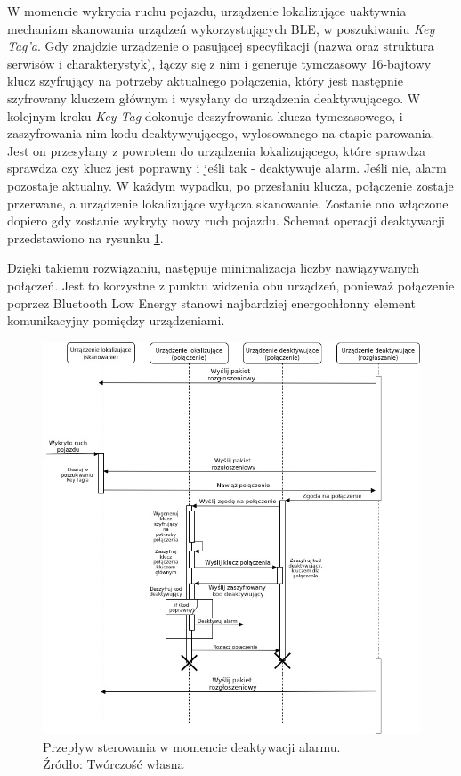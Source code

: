 \pagebreak
W momencie wykrycia ruchu pojazdu, urządzenie lokalizujące uaktywnia mechanizm skanowania urządzeń wykorzystujących BLE, w poszukiwaniu \textit{Key Tag'a}. Gdy znajdzie urządzenie o pasującej specyfikacji (nazwa oraz struktura serwisów i charakterystyk), łączy się z nim i generuje tymczasowy 16-bajtowy klucz szyfrujący na potrzeby aktualnego połączenia, który jest następnie szyfrowany kluczem głównym i wysyłany do urządzenia deaktywującego. W kolejnym kroku \textit{Key Tag} dokonuje deszyfrowania klucza tymczasowego, i zaszyfrowania nim kodu deaktywyującego, wylosowanego na etapie parowania. Jest on przesyłany z powrotem do urządzenia lokalizującego, które sprawdza sprawdza czy klucz jest poprawny i jeśli tak - deaktywuje alarm. Jeśli nie, alarm pozostaje aktualny. W każdym wypadku, po przesłaniu klucza, połączenie zostaje przerwane, a urządzenie lokalizujące wyłącza skanowanie. Zostanie ono włączone dopiero gdy zostanie wykryty nowy ruch pojazdu. Schemat operacji deaktywacji przedstawiono na rysunku \ref{fig:image_soft_keytag_alarm_deactivation}.

Dzięki takiemu rozwiązaniu, następuje minimalizacja liczby nawiązywanych połączeń. Jest to korzystne z punktu widzenia obu urządzeń, ponieważ połączenie poprzez Bluetooth Low Energy stanowi najbardziej energochłonny element komunikacyjny pomiędzy urządzeniami.  

\begin{figure}[H]
	\centering
	\includegraphics[width=17cm]{img/software/keytag/alarm_deactivation.jpg}
	\caption{Przepływ sterowania w momencie deaktywacji alarmu. 
	\\Źródło: Twórczość własna}
	\label{fig:image_soft_keytag_alarm_deactivation}
\end{figure}